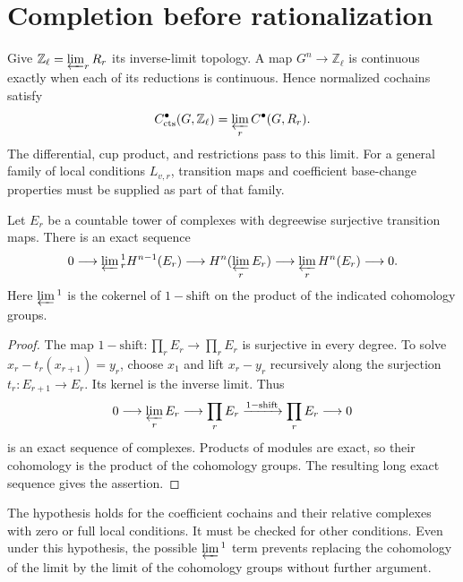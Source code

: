 \section{Completion before rationalization}
\label{v4-arith:coefficients:sec:completion}

Give \(\mathbb Z_\ell=\varprojlim_rR_r\) its inverse-limit topology.
A map \(G^n\to\mathbb Z_\ell\) is continuous exactly when each of
its reductions is continuous. Hence normalized cochains satisfy
\[
 C^\bullet_{\mathrm{cts}}(G,\mathbb Z_\ell)
 =\varprojlim_r C^\bullet(G,R_r).
\]
The differential, cup product, and restrictions pass to this limit.
For a general family of local conditions \(L_{v,r}\), transition
maps and coefficient base-change properties must be supplied as part
of that family.

\begin{proposition}\label{v4-arith:coefficients:prop:milnor}
Let \(E_r\) be a countable tower of complexes with degreewise
surjective transition maps. There is an exact sequence
\[
 0\longrightarrow\varprojlim{}^1_r H^{n-1}(E_r)
 \longrightarrow H^n(\varprojlim_r E_r)
 \longrightarrow\varprojlim_r H^n(E_r)\longrightarrow0.
\]
Here \(\varprojlim{}^1\) is the cokernel of \(1-\mathrm{shift}\)
on the product of the indicated cohomology groups.
\end{proposition}
\begin{proof}
The map \(1-\mathrm{shift}:\prod_rE_r\to\prod_rE_r\) is
surjective in every degree. To solve \(x_r-t_r(x_{r+1})=y_r\),
choose \(x_1\) and lift \(x_r-y_r\) recursively along the
surjection \(t_r:E_{r+1}\to E_r\). Its kernel is the inverse limit.
Thus
\[
 0\longrightarrow\varprojlim_rE_r\longrightarrow\prod_rE_r
 \xrightarrow{1-\mathrm{shift}}\prod_rE_r\longrightarrow0
\]
is an exact sequence of complexes. Products of modules are exact,
so their cohomology is the product of the cohomology groups.
The resulting long exact sequence gives the assertion.
\end{proof}

The hypothesis holds for the coefficient cochains and their relative
complexes with zero or full local conditions. It must be checked for
other conditions. Even under this hypothesis, the possible
\(\varprojlim{}^1\) term prevents replacing the cohomology of the
limit by the limit of the cohomology groups without further argument.

